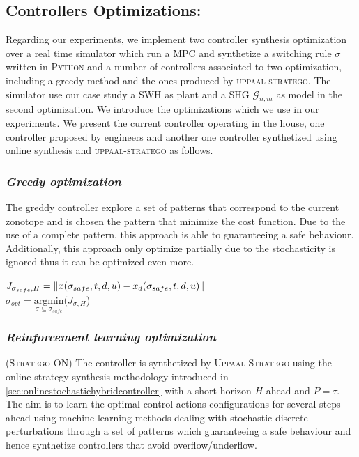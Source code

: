     \subsection{Controllers Optimizations:}
      Regarding our experiments, we implement two controller synthesis 
      optimization over a real time simulator which run a \ac{MPC} and 
      synthetize a switching rule $\sigma$ written in  \textsc{Python} 
      and a number of controllers associated to two optimization, 
      including a greedy method and the ones produced by \textsc{uppaal 
      stratego}. The simulator use our case study a \ac{SWH} as plant
      and a \ac{SHG} $\mathcal{G}_{n,m}$ as model in the second 
      optimization. We introduce the optimizations which we use in our experiments. We
      present the current controller operating in the house, one controller
      proposed by engineers and another one controller synthetized using 
      online synthesis and \textsc{uppaal-stratego} as follows.

      \subsubsection{ \emph{Greedy optimization}}
        The greddy controller explore a set of patterns that correspond to the 
        current zonotope and is chosen the pattern that minimize
        the cost function. Due to the use of a complete pattern, this 
        approach is able to guaranteeing a safe behaviour. Additionally, this 
        approach only optimize partially due to the stochasticity is ignored 
        thus it can be optimized even more.
        
        \begin{center}
          $J_{\sigma_{safe},H} = \left\lVert x(\sigma_{safe},t,d,u)-x_d(\sigma_{safe},t,d,u)\right\rVert $ \\
          $\sigma_{opt} = \underset{\sigma \subseteq \sigma_{safe}}{\mathrm{argmin}}(J_{\sigma,H}$)
        \end{center}

      \subsubsection{ \emph{Reinforcement learning optimization} }
        \label{sssection:upppalstratego}
        (\textsc{Stratego-ON}) The controller is synthetized by \textsc{Uppaal Stratego}
        using the online strategy synthesis methodology introduced in 
        \autoref{sec:onlinestochastichybridcontroller} with a short 
        horizon $H$ ahead and $ P=\tau$. The aim is to learn the optimal control actions 
        configurations for several steps ahead using machine learning 
        methods dealing with stochastic discrete perturbations through
        a set of patterns which guaranteeing a safe behaviour and hence
        synthetize controllers that avoid overflow/underflow.
        
